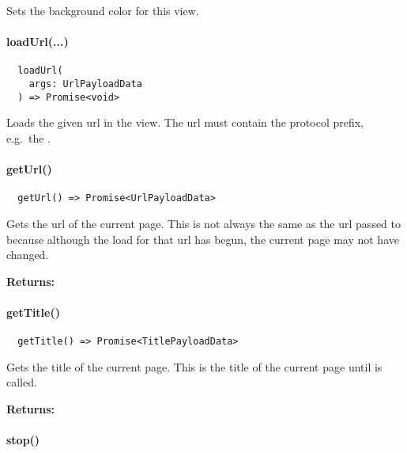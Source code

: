 Sets the background color for this view.



\paragraph{loadUrl(...)}

\begin{verbatim}
  loadUrl(
    args: UrlPayloadData
  ) => Promise<void>
\end{verbatim}

Loads the given url in the view.
The url must contain the protocol prefix, e.g.\ the .


\newpage

\paragraph{getUrl()}

\begin{verbatim}
  getUrl() => Promise<UrlPayloadData>
\end{verbatim}

Gets the \ac{url} of the current page.
This is not always the same as the \ac{url} passed to 
because although the load for that \ac{url} has begun, the current page may not have changed.

\textbf{Returns:} 



\paragraph{getTitle()}

\begin{verbatim}
  getTitle() => Promise<TitlePayloadData>
\end{verbatim}

Gets the title of the current page.
This is the title of the current page until  is called.

\textbf{Returns:} 



\paragraph{stop()}

